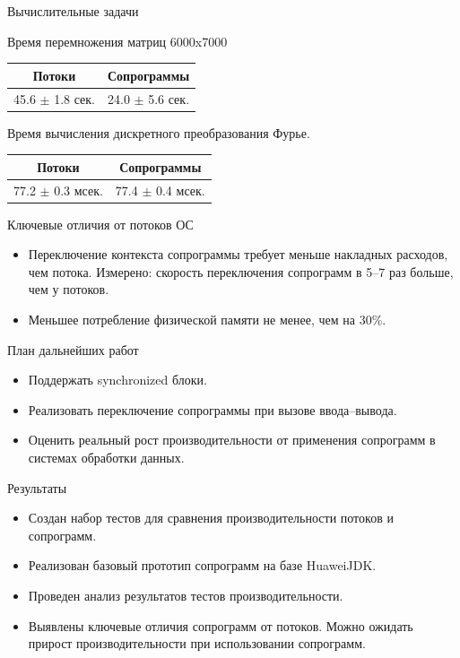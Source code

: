\begin{frame}{Вычислительные задачи}
	\begin{table}[H]
		Время перемножения матриц 6000x7000
		\begin{tabular}{|c|c|} 
			\hline Потоки              & Сопрограммы           \\
			\hline 45.6 $\pm$ 1.8 сек.   & 24.0 $\pm$ 5.6 сек. \\ 
			\hline
		\end{tabular}
	\end{table}
	\begin{table}[H]
		Время вычисления дискретного преобразования Фурье.
		\begin{tabular}{ |c|c| } 
			\hline Потоки                 & Сопрограммы         \\
			\hline 77.2 $\pm$ 0.3 мсек.   & 77.4 $\pm$ 0.4 мсек.\\ 
			\hline
		\end{tabular}
	\end{table}

\end{frame}

\begin{frame}{Ключевые отличия от потоков ОС}
	\begin{itemize}
		\item Переключение контекста сопрограммы требует меньше накладных расходов, чем потока. Измерено: скорость переключения сопрограмм в 5--7 раз больше, чем у потоков.
		\item Меньшее потребление физической памяти не менее, чем на 30\%.
	\end{itemize}
\end{frame}

\begin{frame}{План дальнейших работ} 
	\begin{itemize}
		\item Поддержать synchronized блоки.
		\item Реализовать переключение сопрограммы при вызове ввода--вывода.
		\item Оценить реальный рост производительности от применения сопрограмм в системах обработки данных.
	\end{itemize}
\end{frame}

\begin{frame}{Результаты}
	\begin{itemize}
		\item Создан набор тестов для сравнения производительности потоков и сопрограмм.
		\item Реализован базовый прототип сопрограмм на базе HuaweiJDK.
		\item Проведен анализ результатов тестов производительности.
		\item Выявлены ключевые отличия сопрограмм от потоков. Можно ожидать прирост
		производительности при использовании сопрограмм.
	\end{itemize}
\end{frame}

